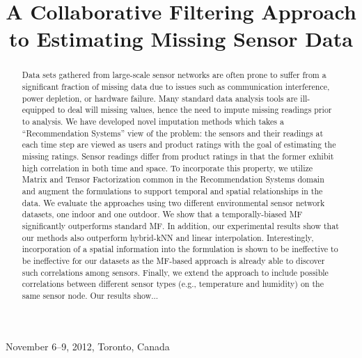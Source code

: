\documentclass[10pt]{sensys11}
\begin{document}
\title{A Collaborative Filtering Approach\\to Estimating Missing Sensor Data}
\author{
}

 {November 6--9, 2012, Toronto, Canada}

\maketitle

\begin{abstract}
Data sets gathered from large-scale sensor networks are often prone to suffer from a significant fraction of missing data due to issues such as communication interference, power depletion, or hardware failure. 
Many standard data analysis tools are ill-equipped to deal will missing values, hence the need to impute missing readings prior to analysis.
We have developed novel imputation methods which takes a ``Recommendation Systems'' view of the problem: the sensors and their readings at each time step are viewed as users and product ratings with the goal of estimating the missing ratings.
Sensor readings differ from product ratings in that the former exhibit high correlation in both time and space.
To incorporate this property, we utilize Matrix and Tensor Factorization common in the Recommendation Systems domain and augment the formulations to support temporal and spatial relationships in the data.
We evaluate the approaches using two different environmental sensor network datasets, one indoor and one outdoor.
We show that a temporally-biased MF significantly outperforms standard MF.
In addition, our experimental results show that our methods also outperform hybrid-kNN and linear interpolation.
Interestingly, incorporation of a spatial information into the formulation is shown to be ineffective to be ineffective for our datasets as the MF-based approach is already able to discover such correlations among sensors.
Finally, we extend the approach to include possible correlations between different sensor types (e.g., temperature and humidity) on the same sensor node.
Our results show...
\end{abstract}
\end{document}
